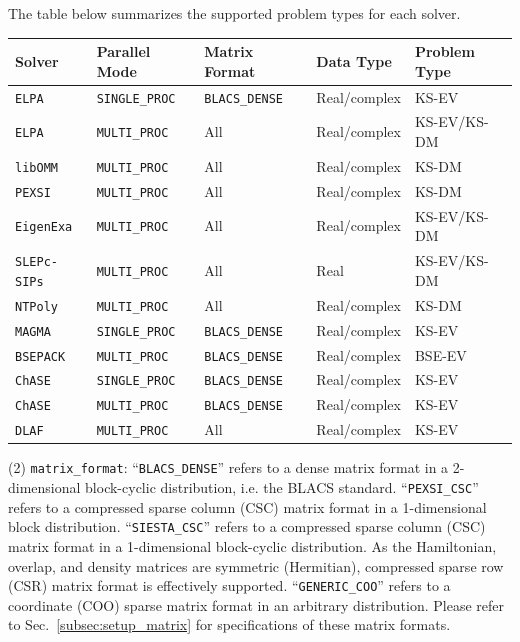\documentclass{report}
\begin{document}
The table below summarizes the supported problem types for each solver.

\begin{tabular}[]{|p{32mm}|p{32mm}|p{32mm}|p{32mm}|p{32mm}|}
\hline
\multicolumn{1}{|l|}{\textbf{Solver}} & \multicolumn{1}{l|}{\textbf{Parallel Mode}} & \multicolumn{1}{l|}{\textbf{Matrix Format}} & \multicolumn{1}{l|}{\textbf{Data Type}} & \multicolumn{1}{l|}{\textbf{Problem Type}}\\
\hline
\texttt{ELPA}       & \texttt{SINGLE\_PROC} & \texttt{BLACS\_DENSE} & Real/complex & KS-EV\\
\hline
\texttt{ELPA}       & \texttt{MULTI\_PROC}  & All                   & Real/complex & KS-EV/KS-DM\\
\hline
\texttt{libOMM}     & \texttt{MULTI\_PROC}  & All                   & Real/complex & KS-DM\\
\hline
\texttt{PEXSI}      & \texttt{MULTI\_PROC}  & All                   & Real/complex & KS-DM\\
\hline
\texttt{EigenExa}   & \texttt{MULTI\_PROC}  & All                   & Real/complex & KS-EV/KS-DM\\
\hline
\texttt{SLEPc-SIPs} & \texttt{MULTI\_PROC}  & All                   & Real         & KS-EV/KS-DM\\
\hline
\texttt{NTPoly}     & \texttt{MULTI\_PROC}  & All                   & Real/complex & KS-DM\\
\hline
\texttt{MAGMA}      & \texttt{SINGLE\_PROC} & \texttt{BLACS\_DENSE} & Real/complex & KS-EV\\
\hline
\texttt{BSEPACK}    & \texttt{MULTI\_PROC}  & \texttt{BLACS\_DENSE} & Real/complex & BSE-EV\\
\hline
\texttt{ChASE}      & \texttt{SINGLE\_PROC} & \texttt{BLACS\_DENSE} & Real/complex & KS-EV\\
\hline
\texttt{ChASE}      & \texttt{MULTI\_PROC}  & \texttt{BLACS\_DENSE} & Real/complex & KS-EV\\
\hline
\texttt{DLAF}       & \texttt{MULTI\_PROC}  & All                   & Real/complex & KS-EV\\
\hline
\end{tabular}

(2) \texttt{matrix\_format}: ``\texttt{BLACS\_DENSE}'' refers to a dense matrix format in a 2-dimensional block-cyclic distribution, i.e. the BLACS standard. ``\texttt{PEXSI\_CSC}'' refers to a compressed sparse column (CSC) matrix format in a 1-dimensional block distribution. ``\texttt{SIESTA\_CSC}'' refers to a compressed sparse column (CSC) matrix format in a 1-dimensional block-cyclic distribution. As the Hamiltonian, overlap, and density matrices are symmetric (Hermitian), compressed sparse row (CSR) matrix format is effectively supported. ``\texttt{GENERIC\_COO}'' refers to a coordinate (COO) sparse matrix format in an arbitrary distribution. Please refer to Sec.~\ref{subsec:setup_matrix} for specifications of these matrix formats.
\end{document}
